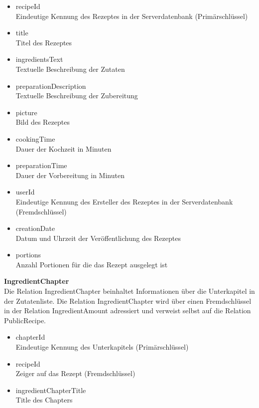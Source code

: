 \begin{itemize}
	\item recipeId \\ Eindeutige Kennung des Rezeptes in der Serverdatenbank (Primärschlüssel)
	\item title \\ Titel des Rezeptes
	\item ingredientsText \\ Textuelle Beschreibung der Zutaten
	\item preparationDescription \\ Textuelle Beschreibung der Zubereitung
	\item picture \\ Bild des Rezeptes
	\item cookingTime \\ Dauer der Kochzeit in Minuten
	\item preparationTime \\ Dauer der Vorbereitung in Minuten
	\item userId \\ Eindeutige Kennung des Ersteller des Rezeptes in der Serverdatenbank (Fremdschlüssel)
	\item creationDate \\ Datum und Uhrzeit der Veröffentlichung des Rezeptes
	\item portions \\ Anzahl Portionen für die das Rezept ausgelegt ist
\end{itemize}

\textbf{IngredientChapter}\\
Die Relation IngredientChapter beinhaltet Informationen über die Unterkapitel in der Zutatenliste. Die Relation IngredientChapter wird über einen Fremdschlüssel in der Relation IngredientAmount adressiert und verweist selbst auf die Relation PublicRecipe.

\begin{itemize}
	\item chapterId \\ Eindeutige Kennung des Unterkapitels (Primärschlüssel)
	\item recipeId \\ Zeiger auf das Rezept (Fremdschlüssel)
	\item ingredientChapterTitle \\Title des Chapters
\end{itemize}

